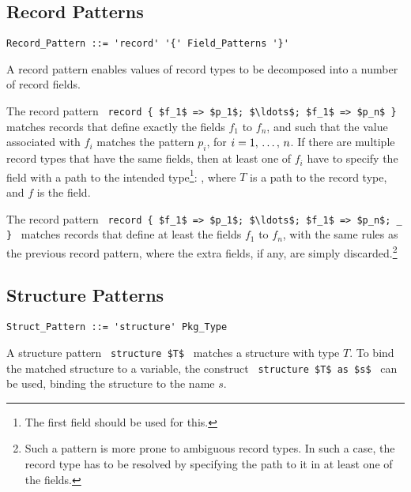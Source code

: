 \subsection{Record Patterns}
\label{sec:record-patterns}

\grammar\begin{lstlisting}
Record_Pattern ::= 'record' '{' Field_Patterns '}'
\end{lstlisting}

A record pattern enables values of record types to be decomposed into a number of record fields. 

The record pattern ~\lstinline!record { $f_1$ => $p_1$; $\ldots$; $f_1$ => $p_n$ }!~ matches records that define exactly the fields $f_1$ to $f_n$, and such that the value associated with $f_i$ matches the pattern $p_i$, for $i = 1 ,\, \ldots ,\, n$. If there are multiple record types that have the same fields, then at least one of $f_i$ have to specify the field with a path to the intended type\footnote{The first field should be used for this.}: , where $T$ is a path to the record type, and $f$ is the field. 

The record pattern ~\lstinline!record { $f_1$ => $p_1$; $\ldots$; $f_1$ => $p_n$; _ }!~ matches records that define at least the fields $f_1$ to $f_n$, with the same rules as the previous record pattern, where the extra fields, if any, are simply discarded.\footnote{Such a pattern is more prone to ambiguous record types. In such a case, the record type has to be resolved by specifying the path to it in at least one of the fields.}





\subsection{Structure Patterns}
\label{sec:structure-patterns}

\grammar\begin{lstlisting}
Struct_Pattern ::= 'structure' Pkg_Type
\end{lstlisting}

A structure pattern ~\lstinline!structure $T$!~ matches a structure with type $T$. To bind the matched structure to a variable, the construct ~\lstinline!structure $T$ as $s$!~ can be used, binding the structure to the name $s$. 










